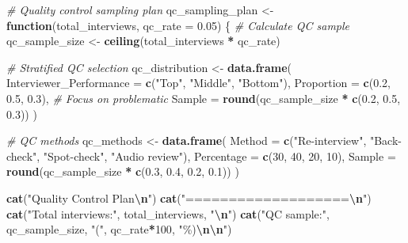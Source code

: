\documentclass[
]{article}
\newenvironment{Shaded}{\begin{snugshade}}{\end{snugshade}}
\newcommand{\AttributeTok}[1]{\textcolor[rgb]{0.13,0.29,0.53}{#1}}
\newcommand{\CommentTok}[1]{\textcolor[rgb]{0.56,0.35,0.01}{\textit{#1}}}
\newcommand{\ControlFlowTok}[1]{\textcolor[rgb]{0.13,0.29,0.53}{\textbf{#1}}}
\newcommand{\DecValTok}[1]{\textcolor[rgb]{0.00,0.00,0.81}{#1}}
\newcommand{\FloatTok}[1]{\textcolor[rgb]{0.00,0.00,0.81}{#1}}
\newcommand{\FunctionTok}[1]{\textcolor[rgb]{0.13,0.29,0.53}{\textbf{#1}}}
\newcommand{\NormalTok}[1]{#1}
\newcommand{\OtherTok}[1]{\textcolor[rgb]{0.56,0.35,0.01}{#1}}
\newcommand{\SpecialCharTok}[1]{\textcolor[rgb]{0.81,0.36,0.00}{\textbf{#1}}}
\newcommand{\StringTok}[1]{\textcolor[rgb]{0.31,0.60,0.02}{#1}}
\begin{document}
\begin{Shaded}
\begin{Highlighting}[]
\CommentTok{\# Quality control sampling plan}
\NormalTok{qc\_sampling\_plan }\OtherTok{\textless{}{-}} \ControlFlowTok{function}\NormalTok{(total\_interviews, }\AttributeTok{qc\_rate =} \FloatTok{0.05}\NormalTok{) \{}
  \CommentTok{\# Calculate QC sample}
\NormalTok{  qc\_sample\_size }\OtherTok{\textless{}{-}} \FunctionTok{ceiling}\NormalTok{(total\_interviews }\SpecialCharTok{*}\NormalTok{ qc\_rate)}
  
  \CommentTok{\# Stratified QC selection}
\NormalTok{  qc\_distribution }\OtherTok{\textless{}{-}} \FunctionTok{data.frame}\NormalTok{(}
    \AttributeTok{Interviewer\_Performance =} \FunctionTok{c}\NormalTok{(}\StringTok{"Top"}\NormalTok{, }\StringTok{"Middle"}\NormalTok{, }\StringTok{"Bottom"}\NormalTok{),}
    \AttributeTok{Proportion =} \FunctionTok{c}\NormalTok{(}\FloatTok{0.2}\NormalTok{, }\FloatTok{0.5}\NormalTok{, }\FloatTok{0.3}\NormalTok{),  }\CommentTok{\# Focus on problematic}
    \AttributeTok{Sample =} \FunctionTok{round}\NormalTok{(qc\_sample\_size }\SpecialCharTok{*} \FunctionTok{c}\NormalTok{(}\FloatTok{0.2}\NormalTok{, }\FloatTok{0.5}\NormalTok{, }\FloatTok{0.3}\NormalTok{))}
\NormalTok{  )}
  
  \CommentTok{\# QC methods}
\NormalTok{  qc\_methods }\OtherTok{\textless{}{-}} \FunctionTok{data.frame}\NormalTok{(}
    \AttributeTok{Method =} \FunctionTok{c}\NormalTok{(}\StringTok{"Re{-}interview"}\NormalTok{, }\StringTok{"Back{-}check"}\NormalTok{, }\StringTok{"Spot{-}check"}\NormalTok{, }
               \StringTok{"Audio review"}\NormalTok{),}
    \AttributeTok{Percentage =} \FunctionTok{c}\NormalTok{(}\DecValTok{30}\NormalTok{, }\DecValTok{40}\NormalTok{, }\DecValTok{20}\NormalTok{, }\DecValTok{10}\NormalTok{),}
    \AttributeTok{Sample =} \FunctionTok{round}\NormalTok{(qc\_sample\_size }\SpecialCharTok{*} \FunctionTok{c}\NormalTok{(}\FloatTok{0.3}\NormalTok{, }\FloatTok{0.4}\NormalTok{, }\FloatTok{0.2}\NormalTok{, }\FloatTok{0.1}\NormalTok{))}
\NormalTok{  )}
  
  \FunctionTok{cat}\NormalTok{(}\StringTok{"Quality Control Plan}\SpecialCharTok{\textbackslash{}n}\StringTok{"}\NormalTok{)}
  \FunctionTok{cat}\NormalTok{(}\StringTok{"===================}\SpecialCharTok{\textbackslash{}n}\StringTok{"}\NormalTok{)}
  \FunctionTok{cat}\NormalTok{(}\StringTok{"Total interviews:"}\NormalTok{, total\_interviews, }\StringTok{"}\SpecialCharTok{\textbackslash{}n}\StringTok{"}\NormalTok{)}
  \FunctionTok{cat}\NormalTok{(}\StringTok{"QC sample:"}\NormalTok{, qc\_sample\_size, }\StringTok{"("}\NormalTok{, qc\_rate}\SpecialCharTok{*}\DecValTok{100}\NormalTok{, }\StringTok{"\%)}\SpecialCharTok{\textbackslash{}n\textbackslash{}n}\StringTok{"}\NormalTok{)}
  

\end{Highlighting}
\end{Shaded}
\end{document}
